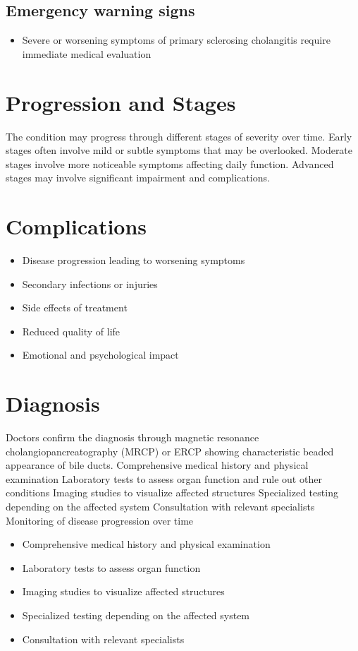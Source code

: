 \subsection{Emergency warning signs}
\begin{itemize}[noitemsep]
  \item Severe or worsening symptoms of primary sclerosing cholangitis require immediate medical evaluation
\end{itemize}
\section{Progression and Stages}
The condition may progress through different stages of severity over time. Early stages often involve mild or subtle symptoms that may be overlooked. Moderate stages involve more noticeable symptoms affecting daily function. Advanced stages may involve significant impairment and complications.
\section{Complications}
\begin{itemize}[noitemsep]
  \item Disease progression leading to worsening symptoms
  \item Secondary infections or injuries
  \item Side effects of treatment
  \item Reduced quality of life
  \item Emotional and psychological impact
\end{itemize}
\section{Diagnosis}
Doctors confirm the diagnosis through magnetic resonance cholangiopancreatography (MRCP) or ERCP showing characteristic beaded appearance of bile ducts. Comprehensive medical history and physical examination Laboratory tests to assess organ function and rule out other conditions Imaging studies to visualize affected structures Specialized testing depending on the affected system Consultation with relevant specialists Monitoring of disease progression over time

\begin{itemize}[noitemsep]
  \item Comprehensive medical history and physical examination
  \item Laboratory tests to assess organ function
  \item Imaging studies to visualize affected structures
  \item Specialized testing depending on the affected system
  \item Consultation with relevant specialists
\end{itemize}
